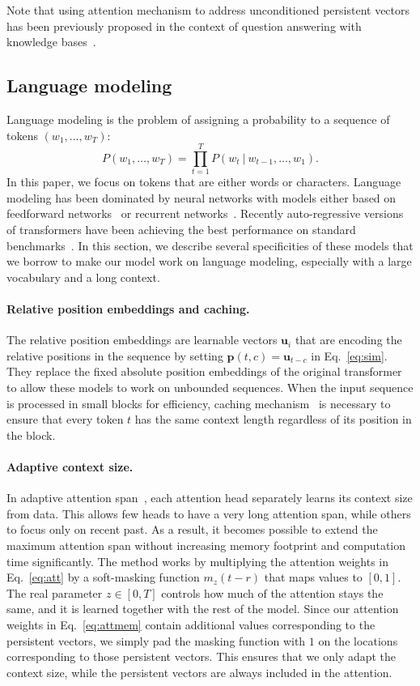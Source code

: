\documentclass{article}
\newcommand{\eq}[1]{Eq.~\ref{eq:#1}}
\begin{document}
Note that using attention mechanism to address unconditioned persistent vectors has been previously proposed in the context of question answering with knowledge bases~\cite{miller2016key}.




\subsection{Language modeling}

Language modeling is the problem of assigning a probability to a sequence of tokens $(w_1,\dots,w_T)$:
$$P(w_1,\dots,w_T) = \prod_{t=1}^T P(w_t~|~w_{t-1},\dots,w_1).$$
In this paper, we focus on tokens that are either words or characters.
Language modeling has been dominated by neural networks with models either based on feedforward networks~\cite{bengio2003neural} or recurrent networks~\cite{mikolov2010recurrent}.
Recently auto-regressive versions of transformers have been achieving the best performance on standard benchmarks~\cite{al2018character,dai2019transformer,baevski2018adaptive}.
In this section, we describe several specificities of these models that we borrow to make our model work on language modeling, especially with a large vocabulary and a long context.

\paragraph{Relative position embeddings and caching.}
The relative position embeddings are learnable vectors $\mathbf{u}_i$ that are encoding the relative positions in the sequence by setting $\mathbf{p}(t,c)=\mathbf{u}_{t-c}$ in \eq{sim}.
They replace the fixed absolute position embeddings of the original transformer to allow these models to work on unbounded sequences. When the input sequence is processed in small blocks for efficiency, caching mechanism~\cite{dai2019transformer} is necessary to ensure that every token $t$ has the same context length regardless of its position in the block.

\paragraph{Adaptive context size.}
In adaptive attention span~\citep{sukhbaatar2019adaptive}, each attention head separately learns its context size from data. This allows few heads to have a very long attention span, while others to focus only on recent past. As a result, it becomes possible to extend the maximum attention span without increasing memory footprint and computation time significantly.
The method works by multiplying the attention weights in \eq{att} by a soft-masking function $m_z(t-r)$ that maps values to $[0, 1]$. The real parameter $z \in [0, T]$ controls how much of the attention stays the same, and it is learned together with the rest of the model.
Since our attention weights in \eq{attmem} contain additional values corresponding to the persistent vectors, we simply pad the masking function with $1$ on the locations corresponding to those persistent vectors. This ensures that we only adapt the context size, while the persistent vectors are always included in the attention.
\end{document}
